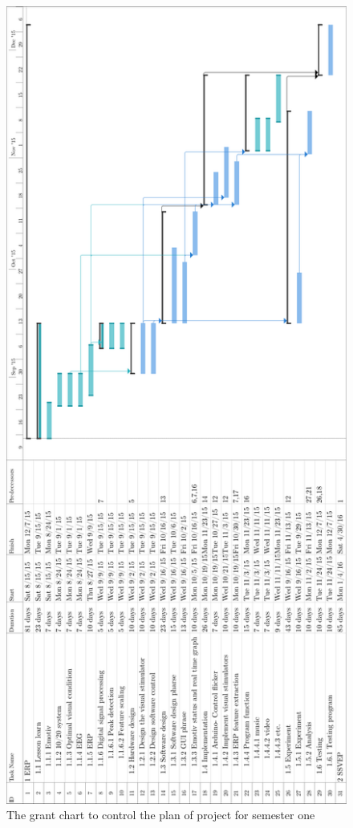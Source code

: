 \newpage

\begin{figure}[ht]
	\centering
	\includegraphics[scale = 0.6]{chapter1/gan1.pdf}
	\caption{The grant chart to control the plan of project for semester one}
\end{figure}

